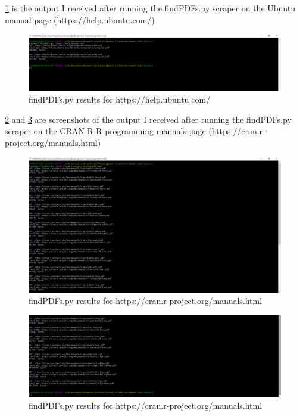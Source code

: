 \documentclass[12pt]{article}
\begin{document}
\ref{fig:q3ResponseUbuntu} is the output I received after running the findPDFs.py scraper on the Ubuntu manual page (https://help.ubuntu.com/)
\begin{figure}[h]
    \centering
    \includegraphics[trim=0 20 10 50, clip, width=\textwidth] {Q3/q3_ubuntuHelp.png}
    \caption{findPDFs.py results for https://help.ubuntu.com/}
    \label{fig:q3ResponseUbuntu}
\end{figure}

\ref{fig:q3ResponsecranR_1} and \ref{fig:q3ResponsecranR_2} are screenshots of the output I received after running the findPDFs.py scraper on the CRAN-R R programming manuals page (https://cran.r-project.org/manuals.html)
\begin{figure}[h]
    \centering
    \includegraphics[trim=0 20 10 50, clip, width=\textwidth] {Q3/q3_cranRManuals.png}
    \caption{findPDFs.py results for https://cran.r-project.org/manuals.html}
    \label{fig:q3ResponsecranR_1}
\end{figure}


\begin{figure}[h]
    \centering
    \includegraphics[trim=0 20 10 50, clip, width=\textwidth] {Q3/q3_cranRManuals2.png}
    \caption{findPDFs.py results for https://cran.r-project.org/manuals.html}
    \label{fig:q3ResponsecranR_2}
\end{figure}
\end{document}

